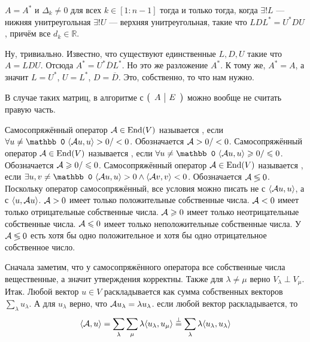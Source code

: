 \documentclass{article}
\begin{document}
\begin{itemize}
\begin{Proof}
        \end{Proof}
        \thm $A=A^*$ и $\Delta_k\neq0$ для всех $k\in[1:n-1]$ тогда и только тогда, когда $\exists!L$ --- нижняя унитреугольная $\exists!U$ --- верхняя унитреугольная, такие что $LDL^*=U^*DU$, причём все $d_k\in\mathbb R$.
        \begin{Proof}
            Ну, тривиально. Известно, что существуют единственные $L,D,U$ такие что $A=LDU$. Отсюда $A^*=U^*\overline DL^*$. Но это же разложение $A^*$. К тому же, $A^*=A$, а значит $L=U^*$, $U=L^*$, $D=\overline D$. Это, собственно, то что нам нужно.
        \end{Proof}
        \begin{Comment}
            В случае таких матриц, в алгоритме с $\arr{c|c}{A&E}$ можно вообще не считать правую часть.
        \end{Comment}
        \dfn Самосопряжённый оператор $\scriptA\in\End(V)$ называется , если $\forall u\neq\mathbb0~\dotprod{\scriptA u}{u}>0/{}<0$. Обозначается $\scriptA>0/{}<0$.
        \dfn Самосопряжённый оператор $\scriptA\in\End(V)$ называется , если $\forall u\neq\mathbb0~\dotprod{\scriptA u}{u}\geqslant0/{}\leqslant0$. Обозначается $\scriptA\geqslant0/{}\leqslant0$.
        \dfn Самосопряжённый оператор $\scriptA\in\End(V)$ называется , если $\exists u,v\neq\mathbb0~\dotprod{\scriptA u}{u}>0\land\dotprod{\scriptA v}{v}<0$. Обозначается $\scriptA\lessgtr0$.
        \thm Поскольку оператор самосопряжённый, все условия можно писать не с $\dotprod{\scriptA u}{u}$, а с $\dotprod{u}{\scriptA u}$.
        \thm $\scriptA>0$ имеет только положительные собственные числа. $\scriptA<0$ имеет только отрицательные собственные числа. $\scriptA\geqslant0$ имеет только неотрицательные собственные числа. $\scriptA\leqslant0$ имеет только неположительные собственные числа. У $\scriptA\lessgtr0$ есть хотя бы одно положительное и хотя бы одно отрицательное собственное число.
        \begin{Proof}
            Сначала заметим, что у самосопряжённого оператора все собственные числа вещественные, а значит утверждения корректны. Также для $\lambda\neq\mu$ верно $V_\lambda\perp V_\mu$. Итак. Любой вектор $u\in V$ раскладывается как сумма собственных векторов $\sum\limits_\lambda u_\lambda$. А для $u_\lambda$ верно, что $\scriptA u_\lambda=\lambda u_\lambda$. если любой вектор раскладывается, то
            $$
            \dotprod{\scriptA}{u}=\sum\limits_{\lambda}\sum\limits_\mu\lambda\dotprod{u_\lambda}{u_\mu}\overset\perp=\sum\limits_{\lambda}\lambda\dotprod{u_\lambda}{u_\lambda}
$$
\end{Proof}
\end{itemize}
\end{document}
